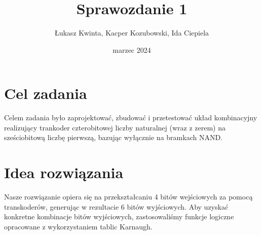 \documentclass[a4paper]{article}
\title{\fontsize{30pt}{30pt}\selectfont Sprawozdanie 1}
\author{\fontsize{20pt}{20pt}\selectfont Łukasz Kwinta, Kacper Kozubowski, Ida Ciepiela}
\date{marzec 2024}
\begin{document}
\maketitle
\section{Cel zadania}
\Large Celem zadania było zaprojektować,
 zbudować i przetestować układ kombinacyjny realizujący trankoder czterobitowej liczby naturalnej (wraz z zerem)
  na sześciobitową liczbę pierwszą, bazując wyłącznie na bramkach NAND.

\section{Idea rozwiązania}
\Large Nasze rozwiązanie opiera się na przekształcaniu 4 bitów wejściowych za pomocą transkoderów, generując w rezultacie 6 bitów wyjściowych.
 Aby uzyskać konkretne kombinacje bitów wyjściowych, zastosowaliśmy funkcje logiczne opracowane z wykorzystaniem tablic Karnaugh.
\end{document}
